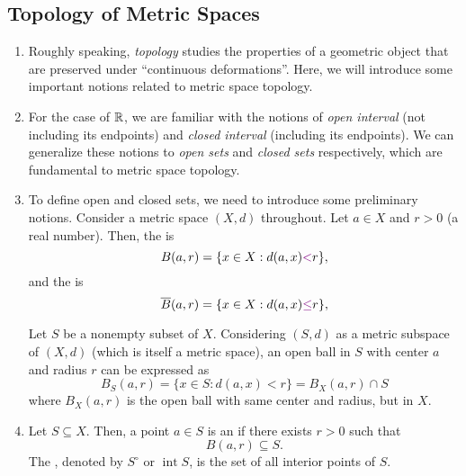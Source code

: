 \subsection{Topology of Metric Spaces}
\begin{enumerate}
\item Roughly speaking, \emph{topology} studies the properties of a geometric
object that are preserved under ``continuous deformations''. Here, we will
introduce some important notions related to metric space topology.

\item For the case of \(\mathbb{R}\), we are familiar with the notions of \emph{open
interval} (not including its endpoints) and \emph{closed interval} (including
its endpoints). We can generalize these notions to \emph{open sets} and
\emph{closed sets} respectively, which are fundamental to metric space
topology.

\item To define open and closed sets, we need to introduce some preliminary
notions. Consider a metric space \((X,d)\) throughout. Let \(a\in X\) and
\(r>0\) (a real number). Then, the  is
\[
B(a,r)=\{x\in X: d(a,x){\color{violet}<}r\},
\]
and the  is
\[
\overline{B}(a,r)=\{x\in X: d(a,x){\color{violet}\le}r\},
\]
\begin{center}
\end{center}
\begin{note}
Let \(S\) be a nonempty subset of \(X\).  Considering \((S,d)\) as a metric
subspace of \((X,d)\) (which is itself a metric space), an open ball in \(S\)
with center \(a\) and radius \(r\) can be expressed as
\[
B_{S}(a,r)=\{x\in S:d(a,x)<r\}=B_{X}(a,r)\cap S
\]
where \(B_X(a,r)\) is the open ball with same center and radius, but in \(X\).
\end{note}
\item Let \(S\subseteq X\). Then, a point \(a\in S\) is an  if there exists \(r>0\) such that
\[
B(a,r)\subseteq S.
\]
The , denoted by \(S^{\circ}\) or
\(\operatorname{int}S\), is the set of all interior points of \(S\).


\end{enumerate}
